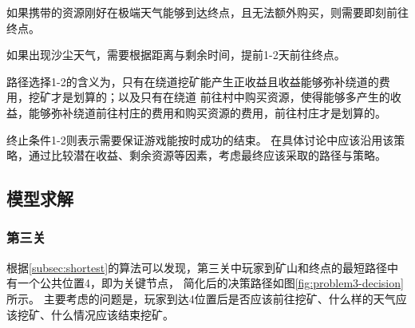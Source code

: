 \documentclass[bwprint]{cumcmthesis} %
\begin{document}
\begin{decisionend}
    如果携带的资源刚好在极端天气能够到达终点，且无法额外购买，则需要即刻前往终点。
    \label{deci:day1}
\end{decisionend}

\begin{decisionend}
    如果出现沙尘天气，需要根据距离与剩余时间，提前1-2天前往终点。
    \label{deci:day2}
\end{decisionend}

路径选择1-2的含义为，只有在绕道挖矿能产生正收益且收益能够弥补绕道的费用，挖矿才是划算的；以及只有在绕道
前往村中购买资源，使得能够多产生的收益，能够弥补绕道前往村庄的费用和购买资源的费用，前往村庄才是划算的。

终止条件1-2则表示需要保证游戏能按时成功的结束。
在具体讨论中应该沿用该策略，通过比较潜在收益、剩余资源等因素，考虑最终应该采取的路径与策略。







\subsection{模型求解}

\subsubsection{第三关}

根据\ref{subsec:shortest}的算法可以发现，第三关中玩家到矿山和终点的最短路径中有一个公共位置4，即为关键节点，
简化后的决策路径如图\ref{fig:problem3-decision}所示。
主要考虑的问题是，玩家到达4位置后是否应该前往挖矿、什么样的天气应该挖矿、什么情况应该结束挖矿。

\end{document}
